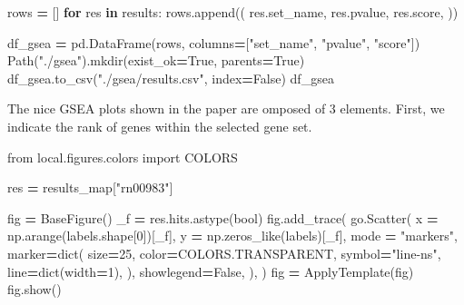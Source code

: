\documentclass[
]{book}
\newenvironment{Shaded}{\begin{snugshade}}{\end{snugshade}}
\newcommand{\BuiltInTok}[1]{#1}
\newcommand{\ControlFlowTok}[1]{\textcolor[rgb]{0.13,0.29,0.53}{\textbf{#1}}}
\newcommand{\DecValTok}[1]{\textcolor[rgb]{0.00,0.00,0.81}{#1}}
\newcommand{\ImportTok}[1]{#1}
\newcommand{\KeywordTok}[1]{\textcolor[rgb]{0.13,0.29,0.53}{\textbf{#1}}}
\newcommand{\NormalTok}[1]{#1}
\newcommand{\OperatorTok}[1]{\textcolor[rgb]{0.81,0.36,0.00}{\textbf{#1}}}
\newcommand{\StringTok}[1]{\textcolor[rgb]{0.31,0.60,0.02}{#1}}
\newcommand{\VariableTok}[1]{\textcolor[rgb]{0.00,0.00,0.00}{#1}}
\begin{document}
\begin{Shaded}
\begin{Highlighting}[numbers=left,,]
\NormalTok{rows }\OperatorTok{=}\NormalTok{ []}
\ControlFlowTok{for}\NormalTok{ res }\KeywordTok{in}\NormalTok{ results:}
\NormalTok{    rows.append((}
\NormalTok{        res.set\_name,}
\NormalTok{        res.pvalue,}
\NormalTok{        res.score,}
\NormalTok{    ))}

\NormalTok{df\_gsea }\OperatorTok{=}\NormalTok{ pd.DataFrame(rows, columns}\OperatorTok{=}\NormalTok{[}\StringTok{"set\_name"}\NormalTok{, }\StringTok{"pvalue"}\NormalTok{, }\StringTok{"score"}\NormalTok{])}
\NormalTok{Path(}\StringTok{"./gsea"}\NormalTok{).mkdir(exist\_ok}\OperatorTok{=}\VariableTok{True}\NormalTok{, parents}\OperatorTok{=}\VariableTok{True}\NormalTok{)}
\NormalTok{df\_gsea.to\_csv(}\StringTok{"./gsea/results.csv"}\NormalTok{, index}\OperatorTok{=}\VariableTok{False}\NormalTok{)}
\NormalTok{df\_gsea}
\end{Highlighting}
\end{Shaded}

The nice GSEA plots shown in the paper are omposed of 3 elements.
First, we indicate the rank of genes within the selected gene set.

\begin{Shaded}
\begin{Highlighting}[numbers=left,,]
\ImportTok{from}\NormalTok{ local.figures.colors }\ImportTok{import}\NormalTok{ COLORS}

\NormalTok{res }\OperatorTok{=}\NormalTok{ results\_map[}\StringTok{"rn00983"}\NormalTok{]}

\NormalTok{fig }\OperatorTok{=}\NormalTok{ BaseFigure()}
\NormalTok{\_f }\OperatorTok{=}\NormalTok{ res.hits.astype(}\BuiltInTok{bool}\NormalTok{)}
\NormalTok{fig.add\_trace(}
\NormalTok{    go.Scatter(}
\NormalTok{        x }\OperatorTok{=}\NormalTok{ np.arange(labels.shape[}\DecValTok{0}\NormalTok{])[\_f],}
\NormalTok{        y }\OperatorTok{=}\NormalTok{ np.zeros\_like(labels)[\_f],}
\NormalTok{        mode }\OperatorTok{=} \StringTok{"markers"}\NormalTok{,}
\NormalTok{        marker}\OperatorTok{=}\BuiltInTok{dict}\NormalTok{(}
\NormalTok{            size}\OperatorTok{=}\DecValTok{25}\NormalTok{,}
\NormalTok{            color}\OperatorTok{=}\NormalTok{COLORS.TRANSPARENT,}
\NormalTok{            symbol}\OperatorTok{=}\StringTok{"line{-}ns"}\NormalTok{,}
\NormalTok{            line}\OperatorTok{=}\BuiltInTok{dict}\NormalTok{(width}\OperatorTok{=}\DecValTok{1}\NormalTok{),}
\NormalTok{        ),}
\NormalTok{        showlegend}\OperatorTok{=}\VariableTok{False}\NormalTok{,}
\NormalTok{    ),}
\NormalTok{)}
\NormalTok{fig }\OperatorTok{=}\NormalTok{ ApplyTemplate(fig)}
\NormalTok{fig.show()}
\end{Highlighting}
\end{Shaded}
\end{document}
